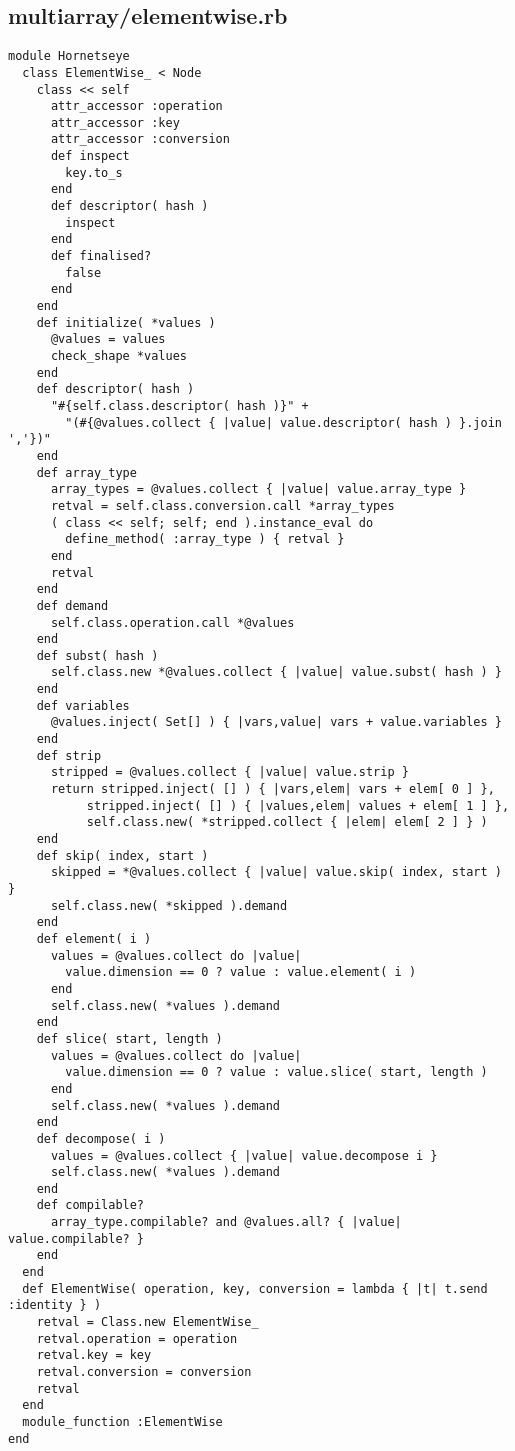 \subsection{multiarray/elementwise.rb}\label{cha:multiarray-elementwise-rb}
\begin{lstlisting}
module Hornetseye
  class ElementWise_ < Node
    class << self
      attr_accessor :operation
      attr_accessor :key
      attr_accessor :conversion
      def inspect
        key.to_s
      end
      def descriptor( hash )
        inspect
      end
      def finalised?
        false
      end
    end
    def initialize( *values )
      @values = values
      check_shape *values
    end
    def descriptor( hash )
      "#{self.class.descriptor( hash )}" +
        "(#{@values.collect { |value| value.descriptor( hash ) }.join ','})"
    end
    def array_type
      array_types = @values.collect { |value| value.array_type }
      retval = self.class.conversion.call *array_types
      ( class << self; self; end ).instance_eval do
        define_method( :array_type ) { retval }
      end
      retval
    end
    def demand
      self.class.operation.call *@values
    end
    def subst( hash )
      self.class.new *@values.collect { |value| value.subst( hash ) }
    end
    def variables
      @values.inject( Set[] ) { |vars,value| vars + value.variables }
    end
    def strip
      stripped = @values.collect { |value| value.strip }
      return stripped.inject( [] ) { |vars,elem| vars + elem[ 0 ] },
           stripped.inject( [] ) { |values,elem| values + elem[ 1 ] },
           self.class.new( *stripped.collect { |elem| elem[ 2 ] } )
    end
    def skip( index, start )
      skipped = *@values.collect { |value| value.skip( index, start ) }
      self.class.new( *skipped ).demand
    end
    def element( i )
      values = @values.collect do |value|
        value.dimension == 0 ? value : value.element( i )
      end
      self.class.new( *values ).demand
    end
    def slice( start, length )
      values = @values.collect do |value|
        value.dimension == 0 ? value : value.slice( start, length )
      end
      self.class.new( *values ).demand
    end
    def decompose( i )
      values = @values.collect { |value| value.decompose i }
      self.class.new( *values ).demand
    end
    def compilable?
      array_type.compilable? and @values.all? { |value| value.compilable? }
    end
  end
  def ElementWise( operation, key, conversion = lambda { |t| t.send :identity } )
    retval = Class.new ElementWise_
    retval.operation = operation
    retval.key = key
    retval.conversion = conversion
    retval
  end
  module_function :ElementWise
end
\end{lstlisting}

